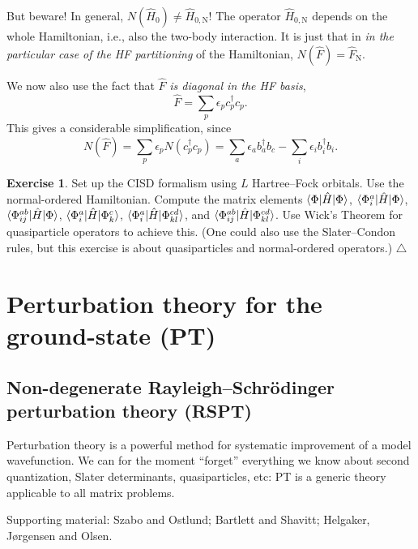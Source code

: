 \documentclass{report}
\theoremstyle{plain}
\theoremstyle{definition}
\newtheorem{exerc}{Exercise}[chapter]
\newcommand\xqed[1]{%
  \leavevmode\unskip\penalty9999 \hbox{}\nobreak\hfill
  \quad\hbox{#1}}
\newcommand\demo{\xqed{$\triangle$}}
\newenvironment{exercise}{\bigskip\begin{exerc}}{\demo\end{exerc}\bigskip}
\begin{document}
But beware! In general, $N(\hat{H}_0) \neq \hat{H}_{0,\text{N}}$! The
operator $\hat{H}_{0,\text{N}}$ depends on the whole Hamiltonian,
i.e., also the two-body interaction. It is just that in \emph{in the
  particular case of the HF partitioning} of the Hamiltonian,
$N(\hat{F}) = \hat{F}_\text{N}$.

We now also use the fact that $\hat{F}$ \emph{is diagonal in the HF basis},
\begin{equation}
  \hat{F} = \sum_p \epsilon_p c^\dag_p c_p.
\end{equation}
This gives a considerable simplification, since
\begin{equation}
  N(\hat{F}) = \sum_p \epsilon_p N(c^\dag_p c_p) = \sum_a \epsilon_a
  b^\dag_a b_c - \sum_i \epsilon_i b^\dag_i b_i.
\end{equation}

\begin{exercise}
  Set up the CISD formalism using $L$ Hartree--Fock orbitals. Use the
  normal-ordered Hamiltonian. Compute the
  matrix elements $\braket{\Phi|\hat{H}|\Phi}$,
  $\braket{\Phi_i^a|\hat{H}|\Phi}$,
  $\braket{\Phi_{ij}^{ab}|\hat{H}|\Phi}$,
  $\braket{\Phi_i^a|\hat{H}|\Phi_k^c}$,
  $\braket{\Phi_{i}^{a}|\hat{H}|\Phi_{kl}^{cd}}$, and
  $\braket{\Phi_{ij}^{ab}|\hat{H}|\Phi_{kl}^{cd}}$. Use Wick's Theorem
  for quasiparticle operators to achieve this. (One could also use the
  Slater--Condon rules, but this exercise is about quasiparticles and
  normal-ordered operators.)
\end{exercise}  

\section{Perturbation theory for the ground-state (PT)} 
\label{sec:perturbation-theory}

\subsection{Non-degenerate Rayleigh--Schr\"odinger perturbation theory (RSPT)}
\label{sec:rspt}

Perturbation theory is a powerful method for systematic improvement of
a model wavefunction. We can for the moment ``forget'' everything we know about
second quantization, Slater determinants, quasiparticles, etc: PT is a
generic theory applicable to all matrix problems.

Supporting material: Szabo and Ostlund; Bartlett and Shavitt;
Helgaker, J{\o}rgensen and Olsen.
\end{document}
